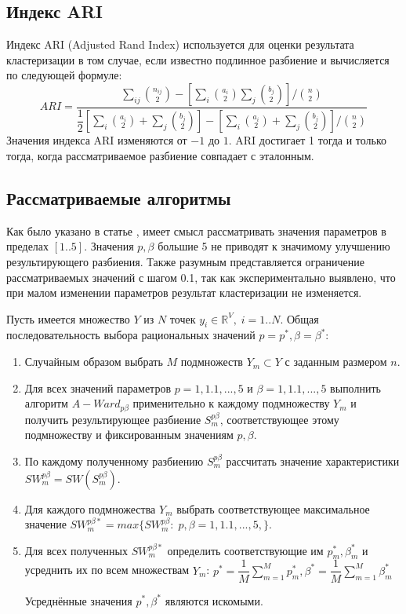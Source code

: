 \documentclass[12pt,twoside,a4paper,tikz,border=5]{refart}
\begin{document}
		\subsection{Индекс ARI}
			Индекс ARI (Adjusted Rand Index) используется для оценки результата кластеризации в том случае, если известно подлинное разбиение \cite{ari} и вычисляется по следующей формуле:
			\begin{equation}
				ARI = \dfrac{\sum_{ij}\binom{n_{ij}}{2}-\left [ \sum_{i}\binom{a_{i}}{2}\sum_{j}\binom{b_{j}}{2} \right ]/\binom{n}{2}}{\dfrac{1}{2} \left [ \sum_i \binom{a_i}{2} + \sum_j \binom{b_j}{2} \right ] - \left [ \sum_i \binom{a_i}{2} + \sum_j \binom{b_j}{2} \right ]/ \binom{n}{2}}
			\end{equation} Значения индекса ARI изменяются от $ -1 $ до $ 1 $. ARI достигает 1 тогда и только тогда, когда рассматриваемое разбиение совпадает с эталонным.
		\subsection{Рассматриваемые алгоритмы}		
			Как было указано в статье \cite{choose-pb}, имеет смысл рассматривать значения параметров в пределах $ [1..5] $. Значения $ p, \beta $ большие 5 не приводят к значимому улучшению результирующего разбиения. Также разумным представляется ограничение рассматриваемых значений с шагом 0.1, так как экспериментально выявлено, что при малом изменении параметров результат кластеризации не изменяется. 
	
			Пусть имеется множество $ Y $ из $ N $ точек $ y_i \in \mathbb{R}^V,\;i=1..N $. Общая последовательность выбора рациональных значений $ p=p^*, \beta=\beta^* $:
			\begin{enumerate}
				\item Случайным образом выбрать $ M $ подмножеств $ Y_m \subset Y $ с заданным размером $ n $.
				\item Для всех значений параметров $ p=1,1.1,...,5 $ и $ \beta=1,1.1,...,5 $ выполнить алгоритм $ A-Ward_{p\beta} $ применительно к каждому подмножеству $ Y_m $ и получить результирующее разбиение $ S_m^{p\beta} $, соответствующее этому подмножеству и фиксированным значениям $ p,\beta $.
				\item По каждому полученному разбиению $ S_m^{p\beta} $ рассчитать значение характеристики $ SW_m^{p\beta}=SW(S_m^{p\beta}) $.
				\item Для каждого подмножества $ Y_m $ выбрать соответствующее максимальное значение $ SW_m^{p\beta*} = max\{SW_m^{p\beta}:\;p,\beta=1,1.1,...,5,\} $. 
				\item Для всех полученных $  SW_m^{p\beta*} $ определить соответствующие им $ p^*_m,\beta^*_m $ и усреднить их по всем множествам $ Y_m $: $ p^*=\dfrac{1}{M}\sum_{m=1}^{M}p^*_m, {\beta^*=\dfrac{1}{M}\sum_{m=1}^{M}\beta^*_m}$
				
				Усреднённые значения $ p^*, \beta^* $ являются искомыми.
				
			\end{enumerate}	
	
\end{document}
